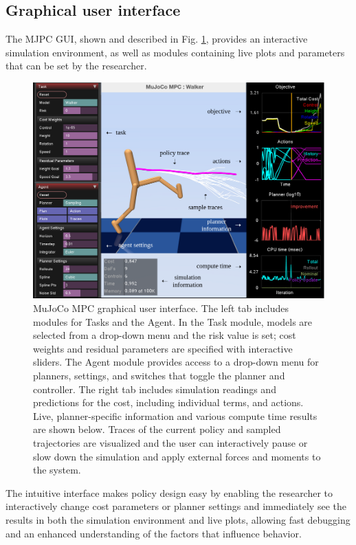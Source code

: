 \subsection{Graphical user interface}

The MJPC GUI, shown and described in Fig. \ref{ps_gui}, provides an interactive simulation environment, as well as modules containing live plots and parameters that can be set by the researcher. 

\begin{figure}[H]
	\centering
	\includegraphics[width=.95\textwidth]{predictive_sampling/gui.png}%
	\caption[MuJoCo MPC graphical user interface]{MuJoCo MPC graphical user interface. The left tab includes modules for Tasks and the Agent. In the Task module, models are selected from a drop-down menu and the risk value is set; cost weights and residual parameters are specified with interactive sliders. The Agent module provides access to a drop-down menu for planners, settings, and switches that toggle the planner and controller. The right tab includes simulation readings and predictions for the cost, including individual terms, and actions. Live, planner-specific information and various compute time results are shown below. Traces of the current policy and sampled trajectories are visualized and the user can interactively pause or slow down the simulation and apply external forces and moments to the system.}%
	\label{ps_gui}
\end{figure}

The intuitive interface makes policy design easy by enabling the researcher to interactively change cost parameters or planner settings and immediately see the results in both the simulation environment and live plots, allowing fast debugging and an enhanced understanding of the factors that influence behavior.

